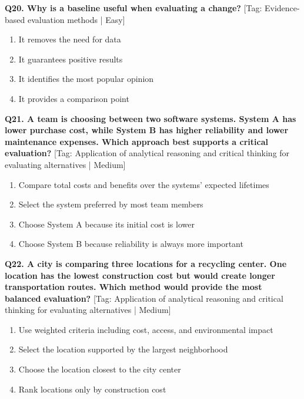 \noindent\textbf{Q20. Why is a baseline useful when evaluating a change?} \hfill [Tag: Evidence-based evaluation methods | Easy]
\begin{enumerate}[label=(\alph*),topsep=2pt,itemsep=1pt,partopsep=0pt,parsep=0pt]
    \item {It removes the need for data}
    \item {It guarantees positive results}
    \item {It identifies the most popular opinion}
    \item {It provides a comparison point}
\end{enumerate}
\vspace{2mm}

\noindent\textbf{Q21. A team is choosing between two software systems. System A has lower purchase cost, while System B has higher reliability and lower maintenance expenses. Which approach best supports a critical evaluation?} \hfill [Tag: Application of analytical reasoning and critical thinking for evaluating alternatives | Medium]
\begin{enumerate}[label=(\alph*),topsep=2pt,itemsep=1pt,partopsep=0pt,parsep=0pt]
    \item {Compare total costs and benefits over the systems' expected lifetimes}
    \item {Select the system preferred by most team members}
    \item {Choose System A because its initial cost is lower}
    \item {Choose System B because reliability is always more important}
\end{enumerate}
\vspace{2mm}

\noindent\textbf{Q22. A city is comparing three locations for a recycling center. One location has the lowest construction cost but would create longer transportation routes. Which method would provide the most balanced evaluation?} \hfill [Tag: Application of analytical reasoning and critical thinking for evaluating alternatives | Medium]
\begin{enumerate}[label=(\alph*),topsep=2pt,itemsep=1pt,partopsep=0pt,parsep=0pt]
    \item {Use weighted criteria including cost, access, and environmental impact}
    \item {Select the location supported by the largest neighborhood}
    \item {Choose the location closest to the city center}
    \item {Rank locations only by construction cost}
\end{enumerate}
\vspace{2mm}

